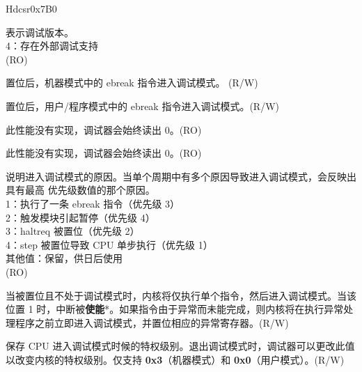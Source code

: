 
\begin{register}{H}{dcsr}{0x7B0}
\label{regdesc:DCSR}
%
%
%
%
%
%
%
%
%
%
%
%
\regnewline%
\begin{regdesc}
\begin{reglist}
\label{fielddesc:DCSRXEDBGVER}\item [xdebugver] 表示调试版本。\\
4：存在外部调试支持\\
(RO)
\label{fielddesc:DCSREBREAKM}\item [ebreakm] 置位后，机器模式中的 ebreak 指令进入调试模式。 (R/W)
\label{fielddesc:DCSREBREAKU}\item [ebreaku] 置位后，用户/程序模式中的 ebreak 指令进入调试模式。(R/W)
\label{fielddesc:DCSRSTOPCOUNT}\item [stopcount] 此性能没有实现，调试器会始终读出 0。(RO)
\label{fielddesc:DCSRSTOPTIME}\item [stoptime] 此性能没有实现，调试器会始终读出 0。(RO)
\label{fielddesc:DCSRCAUSE}\item [cause]  说明进入调试模式的原因。当单个周期中有多个原因导致进入调试模式，会反映出具有最高
优先级数值的那个原因。\\
1：执行了一条 ebreak 指令（优先级 3）\\
2：触发模块引起暂停（优先级 4）\\
3：haltreq 被置位（优先级 2）\\
4：step 被置位导致 CPU 单步执行（优先级 1）\\
其他值：保留，供日后使用\\
(RO)
\label{fielddesc:DCSRSTEP}\item [step] 当被置位且不处于调试模式时，内核将仅执行单个指令，然后进入调试模式。当该位置 1 时，中断被\textbf{使能}*。如果指令由于异常而未能完成，则内核将在执行异常处理程序之前立即进入调试模式，并置位相应的异常寄存器。(R/W)
\label{fielddesc:DCSRPRV}\item [prv] 保存 CPU 进入调试模式时候的特权级别。退出调试模式时，调试器可以更改此值以改变内核的特权级别。仅支持 \textbf{0x3}（机器模式）和 \textbf{0x0}（用户模式）。(R/W)
\end{reglist}
\end{regdesc}
\end{register}

